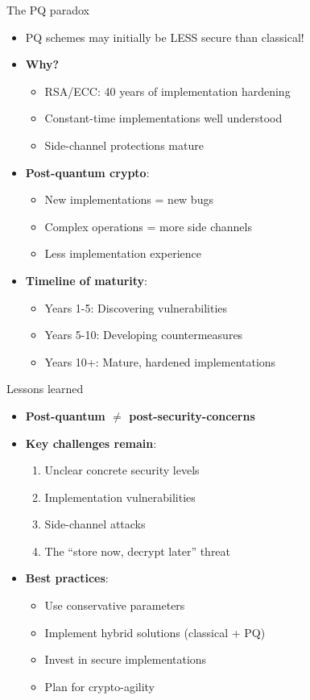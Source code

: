 \documentclass[aspectratio=169, lualatex]{beamer} %
\begin{document}
\begin{frame}{The PQ paradox}
	\begin{itemize}
		\item PQ schemes may initially be LESS secure than classical!
		\item \textbf{Why?}
		      \begin{itemize}
			      \item RSA/ECC: 40 years of implementation hardening
			      \item Constant-time implementations well understood
			      \item Side-channel protections mature
		      \end{itemize}
		\item \textbf{Post-quantum crypto}:
		      \begin{itemize}
			      \item New implementations = new bugs
			      \item Complex operations = more side channels
			      \item Less implementation experience
		      \end{itemize}
		\item \textbf{Timeline of maturity}:
		      \begin{itemize}
			      \item Years 1-5: Discovering vulnerabilities
			      \item Years 5-10: Developing countermeasures
			      \item Years 10+: Mature, hardened implementations
		      \end{itemize}
	\end{itemize}
\end{frame}

\begin{frame}{Lessons learned}
	\begin{itemize}
		\item \textbf{Post-quantum $\neq$ post-security-concerns}
		\item \textbf{Key challenges remain}:
		      \begin{enumerate}
			      \item Unclear concrete security levels
			      \item Implementation vulnerabilities
			      \item Side-channel attacks
			      \item The ``store now, decrypt later'' threat
		      \end{enumerate}
		\item \textbf{Best practices}:
		      \begin{itemize}
			      \item Use conservative parameters
			      \item Implement hybrid solutions (classical + PQ)
			      \item Invest in secure implementations
			      \item Plan for crypto-agility
		      \end{itemize}
	\end{itemize}
\end{frame}
\end{document}
